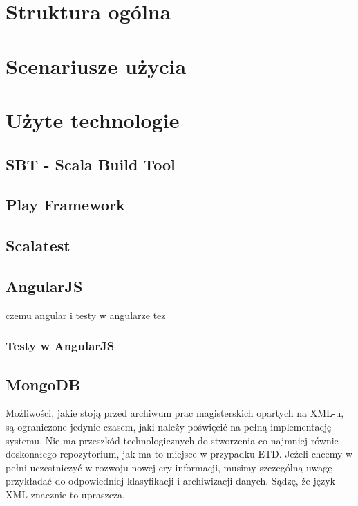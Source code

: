 \documentclass[brudnopis]{xmgr}
\begin{document}
\section{Struktura ogólna}

\section{Scenariusze użycia}

\section{Użyte technologie}

\subsection{SBT - Scala Build Tool}

\subsection{Play Framework}

\subsection{Scalatest}

\subsection{AngularJS}

czemu angular i testy w angularze tez

\subsubsection{Testy w AngularJS}

\subsection{MongoDB}

\summary
Możliwości, jakie stoją przed archiwum prac magisterskich opartych na
XML-u, są ograniczone jedynie czasem, jaki należy poświęcić na pełną
implementację systemu. Nie ma przeszkód technologicznych do stworzenia
co najmniej równie doskonałego repozytorium, jak ma to miejsce w
przypadku ETD. Jeżeli chcemy w pełni uczestniczyć w rozwoju nowej ery
informacji, musimy szczególną uwagę przykładać do odpowiedniej
klasyfikacji i archiwizacji danych. Sądzę, że język XML znacznie to
upraszcza.
\end{document}

